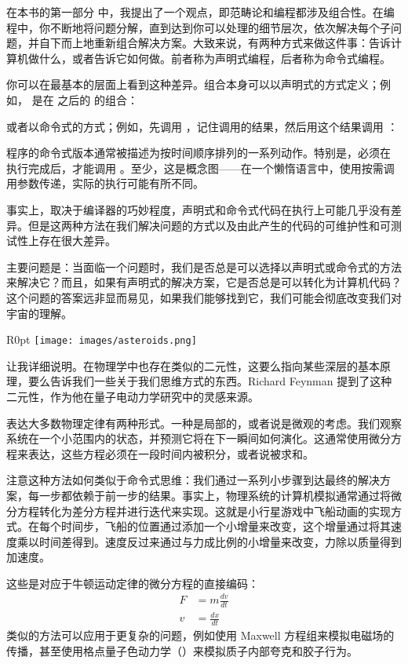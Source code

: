 
\lettrine[lhang=0.17]{在}{本书的第一部分} 中，我提出了一个观点，即范畴论和编程都涉及组合性。在编程中，你不断地将问题分解，直到达到你可以处理的细节层次，依次解决每个子问题，并自下而上地重新组合解决方案。大致来说，有两种方式来做这件事：告诉计算机做什么，或者告诉它如何做。前者称为声明式编程，后者称为命令式编程。

你可以在最基本的层面上看到这种差异。组合本身可以以声明式的方式定义；例如， 是在  之后的  的组合：

或者以命令式的方式；例如，先调用 ，记住调用的结果，然后用这个结果调用 ：

程序的命令式版本通常被描述为按时间顺序排列的一系列动作。特别是，必须在  执行完成后，才能调用 。至少，这是概念图——在一个懒惰语言中，使用按需调用参数传递，实际的执行可能有所不同。

事实上，取决于编译器的巧妙程度，声明式和命令式代码在执行上可能几乎没有差异。但是这两种方法在我们解决问题的方式以及由此产生的代码的可维护性和可测试性上存在很大差异。

主要问题是：当面临一个问题时，我们是否总是可以选择以声明式或命令式的方法来解决它？而且，如果有声明式的解决方案，它是否总是可以转化为计算机代码？这个问题的答案远非显而易见，如果我们能够找到它，我们可能会彻底改变我们对宇宙的理解。

\begin{wrapfigure}{R}{0pt}
  \texttt{[image: images/asteroids.png]}
\end{wrapfigure}

让我详细说明。在物理学中也存在类似的二元性，这要么指向某些深层的基本原理，要么告诉我们一些关于我们思维方式的东西。Richard Feynman 提到了这种二元性，作为他在量子电动力学研究中的灵感来源。

表达大多数物理定律有两种形式。一种是局部的，或者说是微观的考虑。我们观察系统在一个小范围内的状态，并预测它将在下一瞬间如何演化。这通常使用微分方程来表达，这些方程必须在一段时间内被积分，或者说被求和。

注意这种方法如何类似于命令式思维：我们通过一系列小步骤到达最终的解决方案，每一步都依赖于前一步的结果。事实上，物理系统的计算机模拟通常通过将微分方程转化为差分方程并进行迭代来实现。这就是小行星游戏中飞船动画的实现方式。在每个时间步，飞船的位置通过添加一个小增量来改变，这个增量通过将其速度乘以时间差得到。速度反过来通过与力成比例的小增量来改变，力除以质量得到加速度。

这些是对应于牛顿运动定律的微分方程的直接编码：
\begin{align*}
  F & = m \frac{dv}{dt} \\
  v & = \frac{dx}{dt}
\end{align*}
类似的方法可以应用于更复杂的问题，例如使用 Maxwell 方程组来模拟电磁场的传播，甚至使用格点量子色动力学（）来模拟质子内部夸克和胶子行为。


